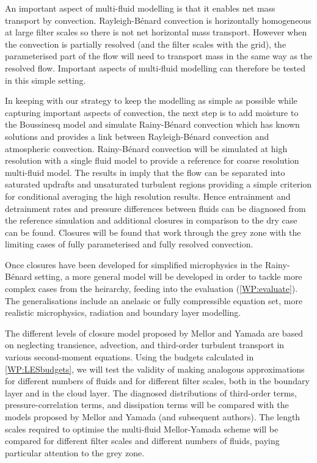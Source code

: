\documentclass[11pt,a4paper]{article}
\begin{document}
An important aspect of multi-fluid modelling is that it enables net mass transport by convection. Rayleigh-B\'enard convection is horizontally homogeneous at large filter scales so there is not net horizontal mass transport. However when the convection is partially resolved (and the filter scales with the grid), the parameterised part of the flow will need to transport mass in the same way as the resolved flow. Important aspects of multi-fluid modelling can therefore be tested in this simple setting.


In keeping with our strategy to keep the modelling as simple as possible while capturing important aspects of convection, the next step is to add moisture to the Boussinesq model and simulate Rainy-B\'enard convection \cite[]{WPS10,VPT19} which has known solutions and provides a link between Rayleigh-B\'enard convection and atmospheric convection. Rainy-B\'enard convection will be simulated at high resolution with a single fluid model to provide a reference for coarse resolution multi-fluid model. The results in \cite{VPT19} imply that the flow can be separated into saturated updrafts and unsaturated turbulent regions providing a simple criterion for conditional averaging the high resolution results. Hence entrainment and detrainment rates and pressure differences between fluids can be diagnosed from the reference simulation and additional closures in comparison to the dry case can be found. Closures will be found that work through the grey zone with the limiting cases of fully parameterised and fully resolved convection.

Once closures have been developed for simplified microphysics in the Rainy-B\'enard setting, a more general model will be developed in order to tackle more complex cases from the heirarchy, feeding into the evaluation (\ref{WP:evaluate}). The generalisations include an anelasic or fully compressible equation set, more realistic microphysics, radiation and boundary layer modelling.


The different levels of closure model proposed by Mellor and Yamada are based on neglecting transience, advection, and third-order turbulent transport in various second-moment equations. Using the budgets calculated in \ref{WP:LESbudgets}, we will test the validity of making analogous approximations for different numbers of fluids and for different filter scales, both in the boundary layer and in the cloud layer. The diagnosed distributions of third-order terms, pressure-correlation terms, and dissipation terms will be compared with the models proposed by Mellor and Yamada (and subsequent authors). The length scales required to optimise the multi-fluid Mellor-Yamada scheme will be compared for different filter scales and different numbers of fluids, paying particular attention to the grey zone. 
\end{document}
